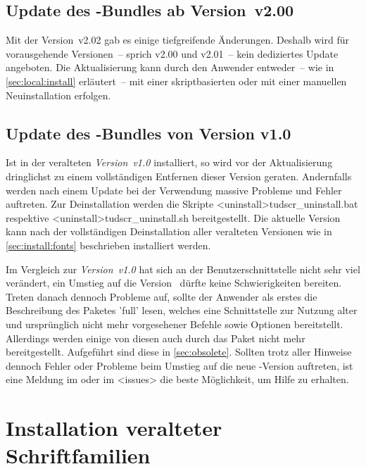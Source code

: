 \subsection{Update des \TUDScript-Bundles ab Version~v2.00}
%
Mit der Version~v2.02 gab es einige tiefgreifende Änderungen. Deshalb wird für 
vorausgehende Versionen~-- sprich v2.00 und v2.01~-- kein dediziertes Update 
angeboten. Die Aktualisierung kann durch den Anwender entweder~-- wie in 
\autoref{sec:local:install} erläutert~-- mit einer skriptbasierten oder mit 
einer manuellen Neuinstallation erfolgen.
%


\subsection{Update des \TUDScript-Bundles von Version v1.0}
%
Ist \TUDScript in der veralteten \emph{Version~v1.0} installiert, so wird vor 
der Aktualisierung dringlichst zu einem vollständigen Entfernen dieser Version 
geraten. Andernfalls werden nach einem Update bei der Verwendung massive 
Probleme und Fehler auftreten. Zur Deinstallation werden die Skripte 
\GitHubDownload<uninstall>{tudscr_uninstall.bat} respektive
\GitHubDownload<uninstall>{tudscr_uninstall.sh} bereitgestellt. Die aktuelle 
Version~\vTUDScript{} kann nach der vollständigen Deinstallation aller 
veralteten Versionen wie in \autoref{sec:install:fonts} beschrieben installiert 
werden.

Im Vergleich zur \emph{Version~v1.0} hat sich an der Benutzerschnittstelle 
nicht sehr viel verändert, ein Umstieg auf die Version~\vTUDScript{} dürfte 
keine Schwierigkeiten bereiten. Treten danach dennoch Probleme auf, sollte der 
Anwender als erstes die Beschreibung des Paketes 'full' 
lesen, welches eine Schnittstelle zur Nutzung alter und ursprünglich nicht mehr 
vorgesehener Befehle sowie Optionen bereitstellt. Allerdings werden einige von 
diesen auch durch das Paket  nicht mehr bereitgestellt. 
Aufgeführt sind diese in \autoref{sec:obsolete}. Sollten trotz aller Hinweise 
dennoch Fehler oder Probleme beim Umstieg auf die neue \TUDScript-Version 
auftreten, ist eine Meldung im \Forum oder im \GitHubRepo<issues> die 
beste Möglichkeit, um Hilfe zu erhalten.



\section{Installation veralteter Schriftfamilien}
%
%

